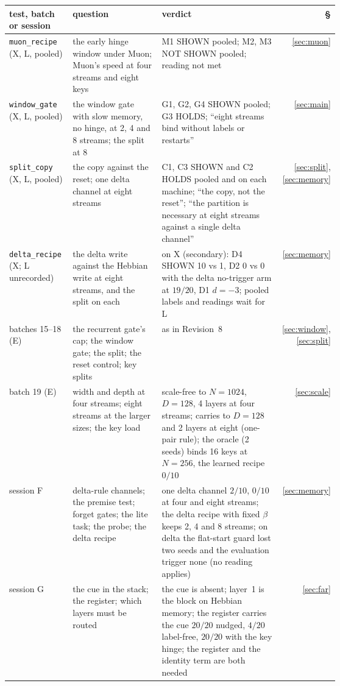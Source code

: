\documentclass[11pt]{article}
\begin{document}
\begin{table}[H]
\centering
\scriptsize
\setlength{\tabcolsep}{4pt}
\begin{tabular}{@{}l>{\raggedright\arraybackslash}p{0.27\linewidth}>{\raggedright\arraybackslash}p{0.36\linewidth}r@{}}
\toprule
test, batch or session & question & verdict & \S\\
\midrule
\texttt{muon\_recipe} (X, L, pooled) & the early hinge window under Muon; Muon's speed at four streams and eight keys & M1 SHOWN pooled; M2, M3 NOT SHOWN pooled; reading not met & \ref{sec:muon}\\
\texttt{window\_gate} (X, L, pooled) & the window gate with slow memory, no hinge, at 2, 4 and 8 streams; the split at 8 & G1, G2, G4 SHOWN pooled; G3 HOLDS; ``eight streams bind without labels or restarts'' & \ref{sec:main}\\
\texttt{split\_copy} (X, L, pooled) & the copy against the reset; one delta channel at eight streams & C1, C3 SHOWN and C2 HOLDS pooled and on each machine; ``the copy, not the reset''; ``the partition is necessary at eight streams against a single delta channel'' & \ref{sec:split}, \ref{sec:memory}\\
\texttt{delta\_recipe} (X; L unrecorded) & the delta write against the Hebbian write at eight streams, and the split on each & on X (secondary): D4 SHOWN 10 vs 1, D2 0 vs 0 with the delta no-trigger arm at $19/20$, D1 $d = -3$; pooled labels and readings wait for L & \ref{sec:memory}\\
\midrule
batches 15--18 (E) & the recurrent gate's cap; the window gate; the split; the reset control; key splits & as in Revision~8 & \ref{sec:window}, \ref{sec:split}\\
batch 19 (E) & width and depth at four streams; eight streams at the larger sizes; the key load & scale-free to $N = 1024$, $D = 128$, 4 layers at four streams; carries to $D = 128$ and 2 layers at eight (one-pair rule); the oracle (2 seeds) binds 16 keys at $N = 256$, the learned recipe $0/10$ & \ref{sec:scale}\\
session F & delta-rule channels; the premise test; forget gates; the lite task; the probe; the delta recipe & one delta channel $2/10$, $0/10$ at four and eight streams; the delta recipe with fixed $\beta$ keeps 2, 4 and 8 streams; on delta the flat-start guard lost two seeds and the evaluation trigger none (no reading applies) & \ref{sec:memory}\\
session G & the cue in the stack; the register; which layers must be routed & the cue is absent; layer~1 is the block on Hebbian memory; the register carries the cue $20/20$ nudged, $4/20$ label-free, $20/20$ with the key hinge; the register and the identity term are both needed & \ref{sec:far}\\

\end{tabular}
\end{table}
\end{document}
